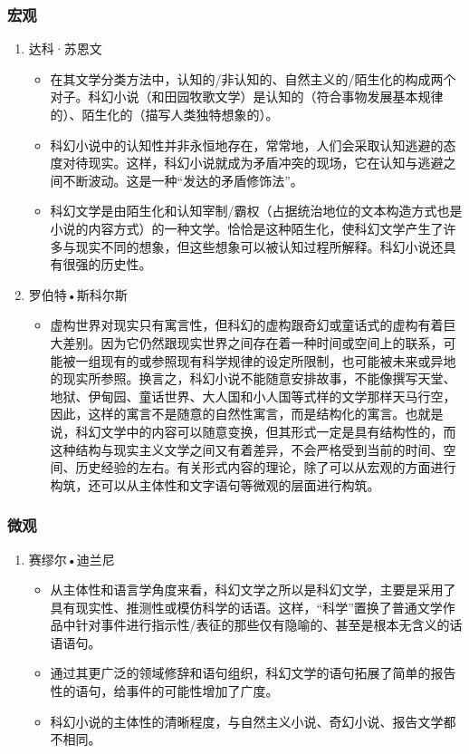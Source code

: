 \documentclass{ctexart}
\begin{document}
\subsubsection{宏观}
\begin{enumerate}
    \item 达科·苏恩文
    \begin{itemize}
        \item 在其文学分类方法中，认知的/非认知的、自然主义的/陌生化的构成两个对子。科幻小说（和田园牧歌文学）是认知的（符合事物发展基本规律的）、陌生化的（描写人类独特想象的）。
        \item 科幻小说中的认知性并非永恒地存在，常常地，人们会采取认知逃避的态度对待现实。这样，科幻小说就成为矛盾冲突的现场，它在认知与逃避之间不断波动。这是一种“发达的矛盾修饰法”。
        \item 科幻文学是由陌生化和认知宰制/霸权（占据统治地位的文本构造方式也是小说的内容方式）的一种文学。恰恰是这种陌生化，使科幻文学产生了许多与现实不同的想象，但这些想象可以被认知过程所解释。科幻小说还具有很强的历史性。
    \end{itemize}

    \item 罗伯特•斯科尔斯
    \begin{itemize}
        \item 虚构世界对现实只有寓言性，但科幻的虚构跟奇幻或童话式的虚构有着巨大差别。因为它仍然跟现实世界之间存在着一种时间或空间上的联系，可能被一组现有的或参照现有科学规律的设定所限制，也可能被未来或异地的现实所参照。换言之，科幻小说不能随意安排故事，不能像撰写天堂、地狱、伊甸园、童话世界、大人国和小人国等式样的文学那样天马行空，因此，这样的寓言不是随意的自然性寓言，而是结构化的寓言。也就是说，科幻文学中的内容可以随意变换，但其形式一定是具有结构性的，而这种结构与现实主义文学之间又有着差异，不会严格受到当前的时间、空间、历史经验的左右。有关形式内容的理论，除了可以从宏观的方面进行构筑，还可以从主体性和文字语句等微观的层面进行构筑。
    \end{itemize}
\end{enumerate}

\subsubsection{微观}

\begin{enumerate}
    \item 赛缪尔•迪兰尼
    \begin{itemize}
        \item 从主体性和语言学角度来看，科幻文学之所以是科幻文学，主要是采用了具有现实性、推测性或模仿科学的话语。这样，“科学”置换了普通文学作品中针对事件进行指示性/表征的那些仅有隐喻的、甚至是根本无含义的话语语句。
        \item 通过其更广泛的领域修辞和语句组织，科幻文学的语句拓展了简单的报告性的语句，给事件的可能性增加了广度。
        \item 科幻小说的主体性的清晰程度，与自然主义小说、奇幻小说、报告文学都不相同。
    \end{itemize}
\end{enumerate}
\end{document}
